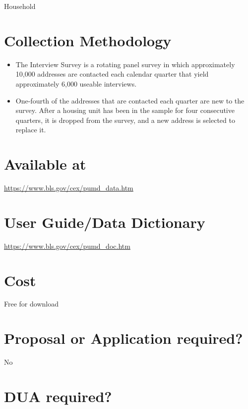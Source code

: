 \documentclass[
]{book}
\providecommand{\tightlist}{%
  \setlength{\itemsep}{0pt}\setlength{\parskip}{0pt}}
\begin{document}
Household

\hypertarget{collection-methodology-18}{%
\section{Collection Methodology}\label{collection-methodology-18}}

\begin{itemize}
\tightlist
\item
  The Interview Survey is a rotating panel survey in which approximately 10,000 addresses are contacted each calendar quarter that yield approximately 6,000 useable interviews.
\item
  One-fourth of the addresses that are contacted each quarter are new to the survey. After a housing unit has been in the sample for four consecutive quarters, it is dropped from the survey, and a new address is selected to replace it.
\end{itemize}

\hypertarget{available-at-18}{%
\section{Available at}\label{available-at-18}}

\url{https://www.bls.gov/cex/pumd_data.htm}

\hypertarget{user-guidedata-dictionary-18}{%
\section{User Guide/Data Dictionary}\label{user-guidedata-dictionary-18}}

\url{https://www.bls.gov/cex/pumd_doc.htm}

\hypertarget{cost-18}{%
\section{Cost}\label{cost-18}}

Free for download

\hypertarget{proposal-or-application-required-18}{%
\section{Proposal or Application required?}\label{proposal-or-application-required-18}}

No

\hypertarget{dua-required-18}{%
\section{DUA required?}\label{dua-required-18}}
\end{document}
